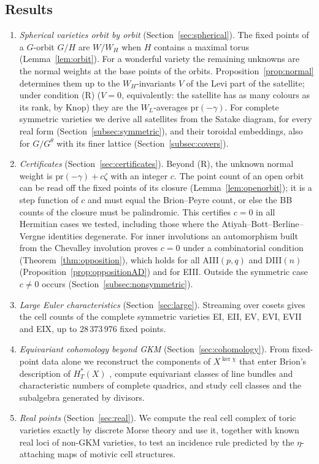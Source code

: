 \documentclass[11pt]{amsart}
\theoremstyle{definition}
\theoremstyle{remark}
\newcommand{\pr}{\mathrm{pr}}
\begin{document}
\subsection*{Results}
\begin{enumerate}
\item \emph{Spherical varieties orbit by orbit} (Section~\ref{sec:spherical}).
The fixed points of a $G$-orbit $G/H$ are $W/W_H$ when $H$ contains a
maximal torus (Lemma~\ref{lem:orbit}). For a wonderful variety the
remaining unknowns are the normal weights at the base points of the
orbits. Proposition~\ref{prop:normal} determines them up to the
$W_H$-invariants $V$ of the Levi part of the satellite; under condition (R)
($V=0$, equivalently: the satellite has as many colours as its rank, by
Knop) they are the $W_L$-averages $\pr(-\gamma)$. For complete symmetric
varieties we derive all satellites from the Satake diagram, for every real
form (Section~\ref{subsec:symmetric}), and their toroidal embeddings, also
for $G/G^\theta$ with its finer lattice (Section~\ref{subsec:covers}).
\item \emph{Certificates} (Section~\ref{sec:certificates}). Beyond (R), the
unknown normal weight is $\pr(-\gamma)+c\zeta$ with an integer $c$. The
point count of an open orbit can be read off the fixed points of its
closure (Lemma~\ref{lem:openorbit}); it is a step function of $c$ and must
equal the Brion--Peyre count, or else the BB counts of the closure must be
palindromic. This certifies $c=0$ in
all Hermitian cases we tested, including those where the
Atiyah--Bott--Berline--Vergne identities degenerate. For inner involutions
an automorphism built from the Chevalley involution proves $c=0$ under a
combinatorial condition (Theorem~\ref{thm:opposition}), which holds for all
AIII$(p,q)$ and DIII$(n)$ (Proposition~\ref{prop:oppositionAD}) and for EIII.
Outside the symmetric case $c\neq0$ occurs (Section~\ref{subsec:nonsymmetric}).
\item \emph{Large Euler characteristics} (Section~\ref{sec:large}).
Streaming over cosets gives the cell counts of the complete symmetric
varieties EI, EII, EV, EVI, EVII and EIX, up to $28\,373\,976$ fixed points.
\item \emph{Equivariant cohomology beyond GKM} (Section~\ref{sec:cohomology}).
From fixed-point data alone we reconstruct the components of $X^{\ker\chi}$
that enter Brion's description of $H_T^*(X)$ \cite{Brion98}, compute
equivariant classes of line bundles and characteristic numbers of complete
quadrics, and study cell classes and the subalgebra generated by divisors.
\item \emph{Real points} (Section~\ref{sec:real}). We compute the real cell
complex of toric varieties exactly by discrete Morse theory and use it,
together with known real loci of non-GKM varieties, to test an incidence
rule predicted by the $\eta$-attaching maps of motivic cell structures.
\end{enumerate}
\end{document}
